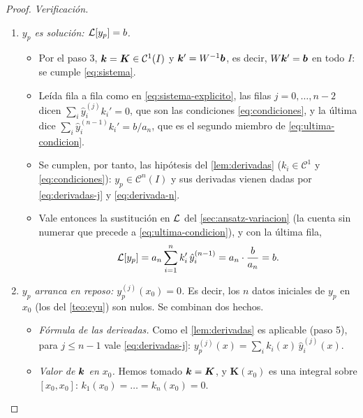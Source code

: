 \begin{proof}
\smallskip\noindent\emph{Verificación.}
\begin{enumerate}[resume, label=\textcolor{cian}{\arabic*.}, leftmargin=1.5em, itemsep=3pt]
  \item \emph{$y_p$ es solución: $\mathcal{L}[y_p]=b$.}
        \begin{itemize}
          \item Por el paso 3, $\bm{k}=\bm K\in\mathcal C^{1}(I)$ y
                $\bm{k}'=W^{-1}\bm{b}$, es decir, $W\bm{k}'=\bm{b}$ en todo $I$: se
                cumple \eqref{eq:sistema}.
          \item Leída fila a fila como en \eqref{eq:sistema-explicito}, las
                filas $j=0,\dots,n-2$ dicen
                $\sum_i\hat y_i^{(j)}k_i'=0$, que son las condiciones
                \eqref{eq:condiciones}, y la última dice
                $\sum_i\hat y_i^{(n-1)}k_i'=b/a_n$, que es el segundo
                miembro de \eqref{eq:ultima-condicion}.
          \item Se cumplen, por tanto, las hipótesis del
                \cref{lem:derivadas} ($k_i\in\mathcal C^{1}$ y
                \eqref{eq:condiciones}): $y_p\in\mathcal C^{n}(I)$ y sus
                derivadas vienen dadas por \eqref{eq:derivadas-j} y
                \eqref{eq:derivada-n}.
          \item Vale entonces la sustitución en $\mathcal{L}$ del
                \cref{sec:ansatz-variacion} (la cuenta sin numerar que
                precede a \eqref{eq:ultima-condicion}), y con la última fila,
                \[
                  \mathcal{L}[y_p]=a_n\sum_{i=1}^{n}k_i'\,\hat y_i^{(n-1)}
                  =a_n\cdot\frac{b}{a_n}=b .
                \]
        \end{itemize}
  \item \emph{$y_p$ arranca en reposo: $y_p^{(j)}(x_0)=0$.} Es decir, los
        $n$ datos iniciales de $y_p$ en $x_0$ (los del \cref{teo:eyu}) son
        nulos. Se combinan dos hechos.
        \begin{itemize}
          \item \emph{Fórmula de las derivadas.} Como el
                \cref{lem:derivadas} es aplicable (paso 5), para
                $j\le n-1$ vale \eqref{eq:derivadas-j}:
                $y_p^{(j)}(x)=\sum_ik_i(x)\,\hat y_i^{(j)}(x)$.
          \item \emph{Valor de $\bm{k}$ en $x_0$.} Hemos tomado $\bm{k}=\bm K$, y
                $\bm K(x_0)$ es una integral sobre $[x_0,x_0]$:
                $k_1(x_0)=\dots=k_n(x_0)=0$.
        \end{itemize}

\end{enumerate}
\end{proof}
